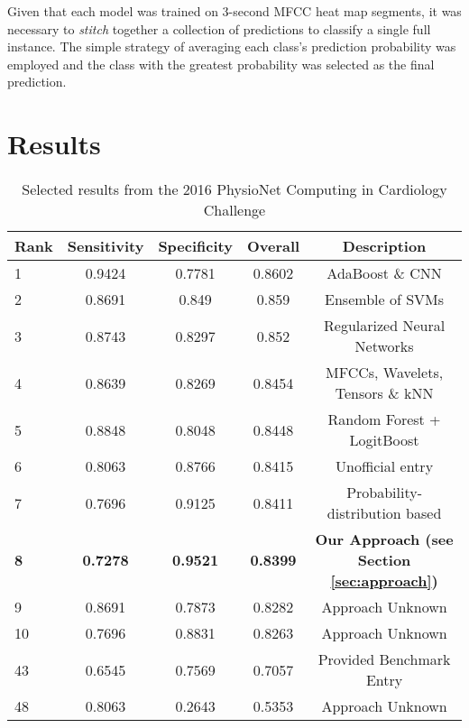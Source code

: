 \documentclass{article}
\begin{document}
Given that each model was trained on 3-second MFCC heat map segments, it was necessary to \emph{stitch} together a collection of predictions to classify a single full instance. The simple strategy of averaging each class's prediction probability was employed and the class with the greatest probability was selected as the final prediction.



\section{Results}
\label{sec:results}

\begin{table*}
  \centering
  \begin{tabular}{lcccc}
    \hline
    Rank & Sensitivity & Specificity & Overall & Description\\
    \hline
    1 &	0.9424	&	0.7781 &	0.8602	& AdaBoost \& CNN\\
    2 &	0.8691	&	0.849   &	0.859	& Ensemble of SVMs\\
    3 &	0.8743	&	0.8297 &	0.852	& Regularized Neural Networks\\
    4 & 	0.8639	&	0.8269 &	0.8454	& MFCCs, Wavelets, Tensors \& kNN\\
    5 & 	0.8848	&	0.8048 &	0.8448	& Random Forest + LogitBoost\\
    6 & 	0.8063	&	0.8766 &	0.8415	& Unofficial entry\\
    7 &	0.7696	&	0.9125 &	0.8411	& Probability-distribution based\\
    \bf{8} &	\bf{0.7278}	&	\bf{0.9521} &	\bf{0.8399}	& \bf{Our Approach (see Section \ref{sec:approach})}\\
    9 &	0.8691	&	0.7873 &	0.8282    	& Approach Unknown\\
    10 &	0.7696	&	0.8831 &	0.8263	& Approach Unknown\\
    \hline
    43 &	0.6545  &	0.7569 &	0.7057		& Provided Benchmark Entry\\
    48 &	0.8063	&	0.2643 &	0.5353	& Approach Unknown\\
    \hline    
  \end{tabular}
  \caption{Selected results from the 2016 PhysioNet Computing in Cardiology Challenge}
  \label{tab:results}
\end{table*}
\end{document}
